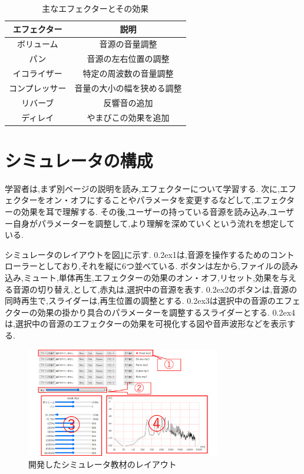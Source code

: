 \documentclass[twocolumn,10pt,a4j]{ltjsarticle}
\begin{document}
\begin{table}[h]
  \centering
  \caption{主なエフェクターとその効果}
  \label{table:effector}
  \small
  \begin{tabular}{cc}
    \hline
    エフェクター  & 説明    \\
    \hline \hline
    ボリューム  & 音源の音量調整 \\
    \hline
    パン  & 音源の左右位置の調整 \\
    \hline
    イコライザー  &  特定の周波数の音量調整 \\
    \hline
    コンプレッサー  &  音量の大小の幅を狭める調整 \\
    \hline
    リバーブ &  反響音の追加 \\
    \hline
    ディレイ  &  やまびこの効果を追加 \\
    \hline
  \end{tabular}
\end{table}

\section{シミュレータの構成}
学習者は,まず別ページの説明を読み,エフェクターについて学習する.
次に,エフェクターをオン・オフにすることやパラメータを変更するなどして,エフェクターの効果を耳で理解する.
その後,ユーザーの持っている音源を読み込み,ユーザー自身がパラメーターを調整して,より理解を深めていくという流れを想定している.

シミュレータのレイアウトを図\ref{fig:layout}に示す.
\raise0.2ex\hbox{\textcircled{\scriptsize{1}}}は,音源を操作するためのコントローラーとしており,それを縦に6つ並べている.
ボタンは左から,ファイルの読み込み,ミュート,単体再生,エフェクターの効果のオン・オフ,リセット,効果を与える音源の切り替え,として,赤丸は,選択中の音源を表す.
\raise0.2ex\hbox{\textcircled{\scriptsize{2}}}のボタンは,音源の同時再生で,スライダーは,再生位置の調整とする.
\raise0.2ex\hbox{\textcircled{\scriptsize{3}}}は選択中の音源のエフェクターの効果の掛かり具合のパラメーターを調整するスライダーとする.
\raise0.2ex\hbox{\textcircled{\scriptsize{4}}}は,選択中の音源のエフェクターの効果を可視化する図や音声波形などを表示する.

\begin{figure}[h]
\centering
 \includegraphics[width=85mm]{./figures/layout.pdf}
 \caption{開発したシミュレータ教材のレイアウト}
 \label{fig:layout}
\end{figure}
\end{document}
